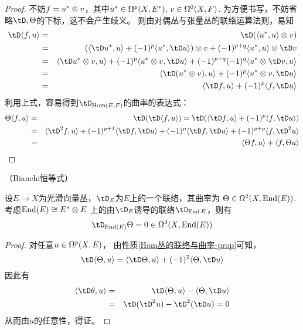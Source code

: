 \begin{proof}
  不妨$f=u^*\otimes v$，其中$u^*\in\Omega^p(X,E^*),\,v\in\Omega^0(X,F)$.
为方便书写，不妨省略$\tD,\Theta$的下标，这不会产生歧义。
则由对偶丛与张量丛的联络运算法则，易知
\begin{eqnarray*}
     \tD\pair{f}{u}
&=&
     \tD(\pair{u^*}{u}\ten v)\\
&=&
        \left(
          \pair{\tD u^*}{u}
         +(-1)^p\pair{u^*}{\tD u}
        \right)\ten v
    +(-1)^{p+q}\pair{u^*}{u}\ten\tD v\\
&=&
     \pair{\tD u^*\ten v}{u}
    +(-1)^p\pair{u^*\ten v}{\tD u}
    +(-1)^{p+q}(-1)^q\pair{u^*\ten\tD v}{u}\\
&=&
     \pair{\tD(u^*\ten v)}{u}
    +(-1)^p\pair{u^*\ten v}{\tD u}\\
&=&
     \pair{\tD f}{u}
    +(-1)^p\pair{f}{\tD u}
\end{eqnarray*}
利用上式，容易得到$\tD_{\Hom(E,F)}$的曲率的表达式：
\begin{eqnarray*}
      \Theta\pair{f}{u}
&=&
     \tD(\tD\pair{f}{u})
 =
     \tD(\pair{\tD f}{u}+(-1)^p\pair{f}{\tD u})\\
&=&
     \pair{\tD^2 f}{u}
    +(-1)^{p+1}\pair{\tD f}{\tD u}
    +(-1)^{p  }\pair{\tD f}{\tD u}
    +(-1)^{p+p}\pair{f}{\tD^2 u}\\
&=&
     \pair{\Theta f}{u}+\pair{f}{\Theta u}
\end{eqnarray*}
\end{proof}

\begin{prop}（Bianchi恒等式）
\label{Bianchi恒等式-prop}

设$E\to X$为光滑向量丛，$\tD_E$为$E$上的一个联络，其曲率为
$\Theta\in\Omega^2(X,\operatorname{End}(E))$.考虑$\operatorname{End}(E)\cong E^*\otimes E$
上的由$\tD_E$诱导的联络$\tD_{\End{E}}$，则有
$$\tD_{\End(E)}\Theta=0\in\Omg^3(X,\End(E))$$
\end{prop}

\begin{proof}对任意$u\in\Omega^p(X,E)$，
由性质\ref{Hom丛的联络与曲率-prop}可知，
$$
  \tD\pair{\Theta}{u}
= \pair{\tD\Theta}{u}
  +(-1)^2\pair{\Theta}{\tD u}
$$
因此有
\begin{eqnarray*}
     \pair{\tD\theta}{u}
&=&
     \tD\pair{\Theta}{u}-\pair{\Theta}{\tD u}\\
&=&
     \tD(\tD^2u)-\tD^2(\tD u)
 =
     0
\end{eqnarray*}
从而由$u$的任意性，得证。
\end{proof}

